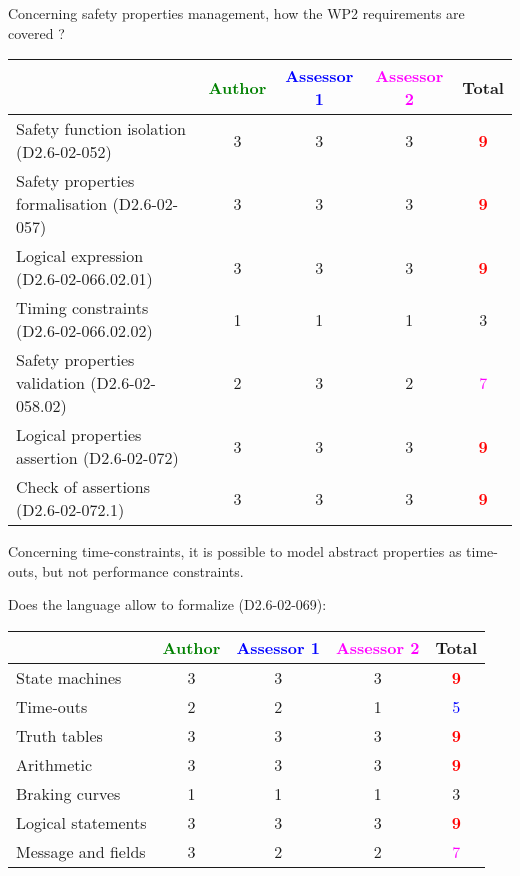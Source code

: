 Concerning safety properties management, how the WP2 requirements are covered ?

\begin{tabular}{|l | c | c | c | c|}
\hline
& \textcolor{green}{Author} & \textcolor{blue}{Assessor 1} & \textcolor{magenta}{Assessor 2} & Total \\
\hline 
Safety function isolation (D2.6-02-052)  & 3    & 3    & 3    & \textcolor{red}{\textbf{9}} \\
\hline 
Safety properties formalisation (D2.6-02-057)  & 3    & 3    & 3    & \textcolor{red}{\textbf{9}} \\
\hline
Logical expression (D2.6-02-066.02.01)  & 3    & 3    & 3    & \textcolor{red}{\textbf{9}} \\
\hline
Timing constraints (D2.6-02-066.02.02)  & 1    & 1    & 1    & 3    \\
\hline
Safety properties validation (D2.6-02-058.02)  & 2    & 3    & 2    & \textcolor{magenta}{7} \\
\hline
Logical properties assertion (D2.6-02-072)  & 3    & 3    & 3    & \textcolor{red}{\textbf{9}} \\
\hline
Check  of assertions (D2.6-02-072.1)  & 3    & 3    & 3    & \textcolor{red}{\textbf{9}} \\
\hline
\end{tabular}


\begin{author_comment}
Concerning time-constraints, it is possible to  model  abstract properties as time-outs, but not performance constraints.
\end{author_comment}


Does the language allow to  formalize (D2.6-02-069):

\begin{tabular}{|l | c | c | c | c|}
\hline
& \textcolor{green}{Author} & \textcolor{blue}{Assessor 1} & \textcolor{magenta}{Assessor 2} & Total \\
\hline 
State machines  & 3    & 3    & 3    & \textcolor{red}{\textbf{9}} \\
\hline
Time-outs  & 2    & 2    & 1    & \textcolor{blue}{5} \\
\hline
Truth tables  & 3    & 3    & 3    & \textcolor{red}{\textbf{9}} \\
\hline
Arithmetic  & 3    & 3    & 3    & \textcolor{red}{\textbf{9}} \\
\hline
Braking curves  & 1    & 1    & 1    & 3    \\
\hline
Logical statements & 3    & 3    & 3    & \textcolor{red}{\textbf{9}} \\
\hline
Message and fields & 3    & 2    & 2    & \textcolor{magenta}{7} \\
\hline
\end{tabular}

